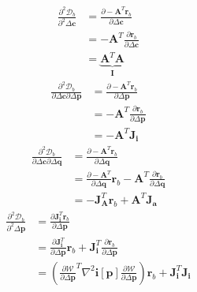 \begin{equation}
    \begin{aligned}
		\frac{\partial^2 \mathcal{D}_b}{\partial^2 \Delta \mathbf{c}} & = \frac{\partial -\mathbf{A}^T \mathbf{r}_b}{\partial \Delta \mathbf{c}}
		\\
		& = -\mathbf{A}^T \frac{\partial \mathbf{r}_b}{\partial \Delta \mathbf{c}}
		\\
		& = \underbrace{\mathbf{A}^T \mathbf{A}}_{\mathbf{I}}
    \label{eq:bidirectional_hessian_term1}
    \end{aligned}
\end{equation}
\begin{equation}
    \begin{aligned}
		\frac{\partial^2 \mathcal{D}_b}{\partial \Delta \mathbf{c} \partial \Delta \mathbf{p}} & = \frac{\partial -\mathbf{A}^T \mathbf{r}_b}{\partial \Delta \mathbf{p}}
		\\
		& = -\mathbf{A}^T \frac{\partial \mathbf{r}_b}{\partial \Delta \mathbf{p}}
		\\
		& = -\mathbf{A}^T \mathbf{J}_{\mathbf{i}}
    \label{eq:bidirectional_hessian_term2}
    \end{aligned}
\end{equation}
\begin{equation}
    \begin{aligned}
		\frac{\partial^2 \mathcal{D}_b}{\partial \Delta \mathbf{c} \partial \Delta \mathbf{q}} & =  \frac{\partial -\mathbf{A}^T \mathbf{r}_b}{\partial \Delta \mathbf{q}}
		\\
		&= \frac{\partial -\mathbf{A}^T}{\partial \Delta \mathbf{q}} \mathbf{r}_b - \mathbf{A}^T \frac{\partial \mathbf{r}_b}{\partial \Delta \mathbf{q}}
		\\
		& = -\mathbf{J}_{\mathbf{A}}^T \mathbf{r}_b + \mathbf{A}^T \mathbf{J}_{\mathbf{a}}
    \label{eq:bidirectional_hessian_term3}
    \end{aligned}
\end{equation}
\begin{equation}
    \begin{aligned}
		\frac{\partial^2 \mathcal{D}_b}{\partial^2 \Delta \mathbf{p}} & =  \frac{\partial \mathbf{J}_{\mathbf{i}}^T \mathbf{r}_b}{\partial \Delta \mathbf{p}}
		\\
		& = \frac{\partial \mathbf{J}_{\mathbf{i}}^T}{\partial \Delta \mathbf{p}} \mathbf{r}_b + \mathbf{J}_{\mathbf{i}}^T \frac{\partial \mathbf{r}_b}{\partial \Delta \mathbf{p}}
		\\
		& = \left( \frac{\partial\mathcal{W}}{\partial \Delta \mathbf{p}}^T \nabla^2 \mathbf{i}[\mathbf{p}] \frac{\partial\mathcal{W}}{\partial \Delta \mathbf{p}} \right) \mathbf{r}_b + \mathbf{J}_{\mathbf{i}}^T \mathbf{J}_{\mathbf{i}}
    \label{q:bidirectional_hessian_term4}
    \end{aligned}
\end{equation}
